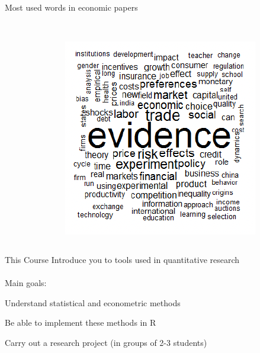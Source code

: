 \documentclass{./../div_teaching_slides}
\begin{document}
\begin{frame}{Most used words in economic papers}
\begin{columns}
\begin{column}[c]{0.3\textwidth}
\end{column}
\begin{column}[c]{0.3\textwidth}
\centering
{} \\ \vspace{0.75em}
\includegraphics[scale=0.4]{2010.png}
\end{column}
\end{columns}
\end{frame}


\begin{frame}{This Course}
Introduce you to tools used in quantitative research \\~\\
Main goals:\\
\begin{witemize}
\item Understand statistical and econometric methods
\item Be able to implement these methods in R
\item Carry out a research project (in groups of 2-3 students)
\end{witemize}
\end{frame}

\end{document}
